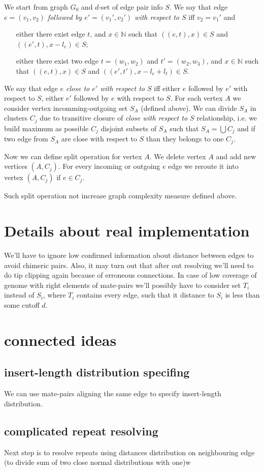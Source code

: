 \documentclass[12pt,a4paper,oneside]{article}
\begin{document}
We start from graph $G_0$ and {$d$-set of edge pair info} $S$.
We say that edge \emph{$e=(v_1, v_2)$ followed by $e'=(v_1', v_2')$ with respect to $S$} iff $v_2 = v_1'$ and 
\begin{itemize}
\item[either ] there exist edge $t$, and $x \in \mathbb{N}  $ such that $((e,t),x) \in S$ and $((e',t),x-l_e)\in S$; 
\item[either ] there exist two edge $t=(w_1,w_2)$ and $t'=(w_2, w_3)$, and $x \in \mathbb{N}$ such that $((e,t),x) \in S$ and $((e',t'),x-l_e+l_t) \in S$. 
\end{itemize}
We say that edge \emph{$e$ close to $e'$ with respect to $S$} iff either $e$ followed by $e'$ with respect to $S$, either $e'$ followed by $e$ with respect to $S$.
For each vertex $A$ we consider vertex incomming-outgoing set $S_A$ (defined above). We can divide $S_A$ in clusters $C_j$ due to transitive closure of \emph{close with respect to $S$} relationship, i.e. we build maximum as possible $C_j$ disjoint subsets of $S_A$ such that $S_A=\bigcup C_j$ and if two edge from $S_A$ are close with respect to $S$ than they belongs to one $C_j$.  

Now we can define split operation for vertex $A$. We delete vertex $A$ and add new vertices $(A, C_j)$. For every incoming or outgoing $e$ edge we reroute it into vertex $(A, C_j)$ if $e\in C_j$. 



Such split operation not increase graph complexity measure defined above. 

\section{Details about real implementation}
We'll have to ignore low confirmed information about distance between edges to avoid chimeric pairs. Also, it may turn out that after out resolving we'll need to do tip clipping again because of erroneous connections.
In case of low coverage of genome with right elements of mate-pairs we'll possibly have to consider set $T_i$ instead of $S_i$, where $T_i$ contains every edge, such that it distance to $S_i$ is less than some cutoff $d$.

\section{connected ideas}
\subsection{insert-length distribution specifing}
We can use mate-pairs aligning the same edge to specify insert-length distribution.
\subsection{complicated repeat resolving}
Next step is to resolve repeats using distances distribution on neighbouring edge (to divide sum of two close normal distributions with one)w
\end{document}
